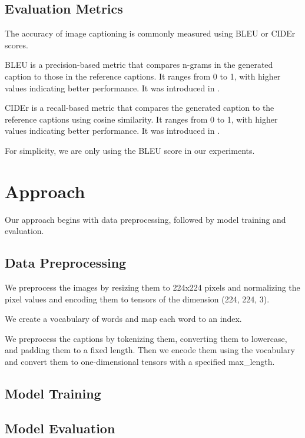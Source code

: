 \documentclass[12pt]{article}
\theoremstyle{plain}
\theoremstyle{definition}
\theoremstyle{remark}
\begin{document}
\subsection{Evaluation Metrics}
The accuracy of image captioning is commonly measured using BLEU or CIDEr scores.
\par BLEU is a precision-based metric that compares n-grams in the generated caption to those in the reference captions. It ranges from 0 to 1, with higher values indicating better performance. It was introduced in \cite{papineni}.
\par CIDEr is a recall-based metric that compares the generated caption to the reference captions using cosine similarity. It ranges from 0 to 1, with higher values indicating better performance. It was introduced in \cite{vedantam}.
\par For simplicity, we are only using the BLEU score in our experiments.



\section{Approach}
\label{sec:approach}

Our approach begins with data preprocessing, followed by model training and evaluation.

\subsection{Data Preprocessing}
\par We preprocess the images by resizing them to 224x224 pixels and normalizing the pixel values and encoding them to tensors of the dimension (224, 224, 3).
\par We create a vocabulary of words and map each word to an index.
\par We preprocess the captions by tokenizing them, converting them to lowercase, and padding them to a fixed length. Then we encode them using the vocabulary and convert them to one-dimensional tensors with a specified max\_length.

\subsection{Model Training}

\subsection{Model Evaluation}
\end{document}
